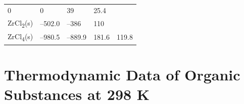 \documentclass[
  9pt,
]{extbook}
\theoremstyle{definition}
\theoremstyle{definition}
\theoremstyle{definition}
\theoremstyle{remark}
\begin{document}
\begin{longtable}[]{@{}lllll@{}}
\begin{minipage}[t]{0.19\columnwidth}
0\strut
\end{minipage} & \begin{minipage}[t]{0.20\columnwidth}\raggedright
0\strut
\end{minipage} & \begin{minipage}[t]{0.18\columnwidth}\raggedright
39\strut
\end{minipage} & \begin{minipage}[t]{0.18\columnwidth}\raggedright
25.4\strut
\end{minipage}\tabularnewline
\begin{minipage}[t]{0.10\columnwidth}\raggedright
ZrCl\textsubscript{2}(s)\strut
\end{minipage} & \begin{minipage}[t]{0.19\columnwidth}\raggedright
--502.0\strut
\end{minipage} & \begin{minipage}[t]{0.20\columnwidth}\raggedright
--386\strut
\end{minipage} & \begin{minipage}[t]{0.18\columnwidth}\raggedright
110\strut
\end{minipage} & \begin{minipage}[t]{0.18\columnwidth}\raggedright
\strut
\end{minipage}\tabularnewline
\begin{minipage}[t]{0.10\columnwidth}\raggedright
ZrCl\textsubscript{4}(s)\strut
\end{minipage} & \begin{minipage}[t]{0.19\columnwidth}\raggedright
--980.5\strut
\end{minipage} & \begin{minipage}[t]{0.20\columnwidth}\raggedright
--889.9\strut
\end{minipage} & \begin{minipage}[t]{0.18\columnwidth}\raggedright
181.6\strut
\end{minipage} & \begin{minipage}[t]{0.18\columnwidth}\raggedright
119.8\strut
\end{minipage}\tabularnewline
\bottomrule
\end{longtable}

\hypertarget{thermodynamic-data-of-organic-substances-at-298-k}{%
\section{Thermodynamic Data of Organic Substances at 298 K}\label{thermodynamic-data-of-organic-substances-at-298-k}}
\end{document}

